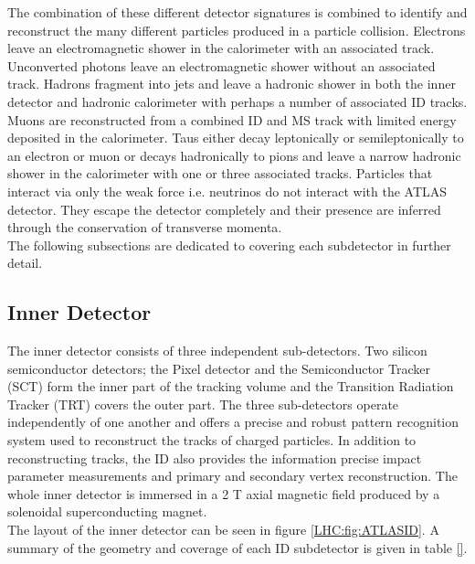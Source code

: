 \indent The combination of these different detector signatures is combined to identify and reconstruct the many different particles produced in a particle collision.  Electrons leave an electromagnetic shower in the calorimeter with an associated track.  Unconverted photons leave an electromagnetic shower without an associated track.  Hadrons fragment into jets and leave a hadronic shower in both the inner detector and hadronic calorimeter with perhaps a number of associated ID tracks.  Muons are reconstructed from a combined ID and MS track with limited energy deposited in the calorimeter.  Taus either decay leptonically or semileptonically to an electron or muon or decays hadronically to pions and leave a narrow hadronic shower in the calorimeter with one or three associated tracks.  Particles that interact via only the weak force i.e. neutrinos do not interact with the ATLAS detector.  They escape the detector completely and their presence are inferred through the conservation of transverse momenta.\\

\indent The following subsections are dedicated to covering each subdetector in further detail. \\

\subsection{ Inner Detector }
\label{LHC:ID}

\indent The inner detector consists of three independent sub-detectors.  Two silicon semiconductor detectors; the Pixel detector and the Semiconductor Tracker (SCT) form the inner part of the tracking volume and the Transition Radiation Tracker (TRT) covers the outer part.  The three sub-detectors operate independently of one another and offers a precise and robust pattern recognition system used to reconstruct the tracks of charged particles.  In addition to reconstructing tracks, the ID also provides the information precise impact parameter measurements and primary and secondary vertex reconstruction. The whole inner detector is immersed in a 2 T axial magnetic field produced by a solenoidal superconducting magnet.  \\

\indent The layout of the inner detector can be seen in figure \ref{LHC:fig:ATLASID}.  A summary of the geometry and coverage of each ID subdetector is given in table \ref{}.  \\

